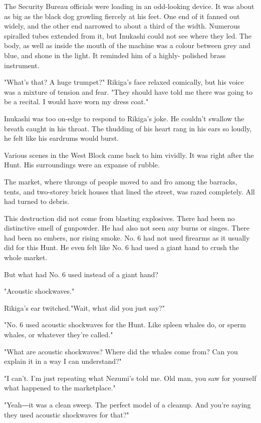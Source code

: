 The Security Bureau officials were loading in an odd-looking device. It
was about as big as the black dog growling fiercely at his feet. One end
of it fanned out widely, and the other end narrowed to about a third of
the width. Numerous spiralled tubes extended from it, but Inukashi could
not see where they led. The body, as well as inside the mouth of the
machine was a colour between grey and blue, and shone in the light. It
reminded him of a highly- polished brass instrument.

"What's that? A huge trumpet?" Rikiga's face relaxed comically, but his
voice was a mixture of tension and fear. "They should have told me there
was going to be a recital. I would have worn my dress coat."

Inukashi was too on-edge to respond to Rikiga's joke. He couldn't
swallow the breath caught in his throat. The thudding of his heart rang
in his ears so loudly, he felt like his eardrums would burst.

Various scenes in the West Block came back to him vividly. It was right
after the Hunt. His surroundings were an expanse of rubble.

The market, where throngs of people moved to and fro among the barracks,
tents, and two-storey brick houses that lined the street, was razed
completely. All had turned to debris.

This destruction did not come from blasting explosives. There had been
no distinctive smell of gunpowder. He had also not seen any burns or
singes. There had been no embers, nor rising smoke. No. 6 had not used
firearms as it usually did for this Hunt. He even felt like No. 6 had
used a giant hand to crush the whole market.

But what had No. 6 used instead of a giant hand?

"Acoustic shockwaves."

Rikiga's ear twitched."Wait, what did you just say?"

"No. 6 used acoustic shockwaves for the Hunt. Like spleen whales do, or
sperm whales, or whatever they're called."

"What are acoustic shockwaves? Where did the whales come from? Can you
explain it in a way I can understand?"

"I can't. I'm just repeating what Nezumi's told me. Old man, you saw for
yourself what happened to the marketplace."

"Yeah―it was a clean sweep. The perfect model of a cleanup. And you're
saying they used acoustic shockwaves for that?"

